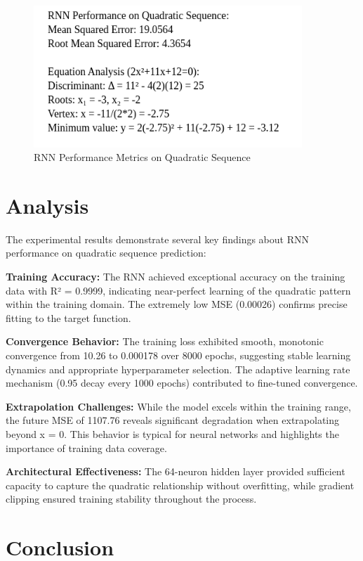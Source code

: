 \documentclass[11pt,a4paper]{article}
\begin{document}
\begin{figure}[H]
\centering
\includegraphics[width=0.9\textwidth]{ss/RNN_Performance_on_Quadratic_Sequence_1.png}
\caption{RNN Performance Metrics on Quadratic Sequence}
\end{figure}

\section{Analysis}

The experimental results demonstrate several key findings about RNN performance on quadratic sequence prediction:

\textbf{Training Accuracy:} The RNN achieved exceptional accuracy on the training data with R² = 0.9999, indicating near-perfect learning of the quadratic pattern within the training domain. The extremely low MSE (0.00026) confirms precise fitting to the target function.

\textbf{Convergence Behavior:} The training loss exhibited smooth, monotonic convergence from 10.26 to 0.000178 over 8000 epochs, suggesting stable learning dynamics and appropriate hyperparameter selection. The adaptive learning rate mechanism (0.95 decay every 1000 epochs) contributed to fine-tuned convergence.

\textbf{Extrapolation Challenges:} While the model excels within the training range, the future MSE of 1107.76 reveals significant degradation when extrapolating beyond x = 0. This behavior is typical for neural networks and highlights the importance of training data coverage.

\textbf{Architectural Effectiveness:} The 64-neuron hidden layer provided sufficient capacity to capture the quadratic relationship without overfitting, while gradient clipping ensured training stability throughout the process.

\section{Conclusion}
\end{document}
